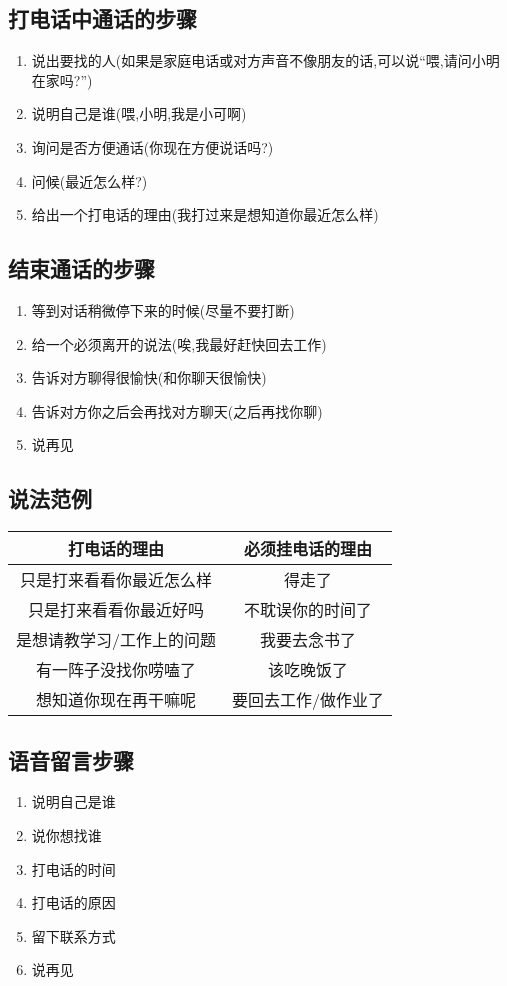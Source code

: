 \documentclass[UTF8]{article}
\newcommand{\indList}{\vspace{-6pt}}
\begin{document}
\subsection{打电话中通话的步骤}
\begin{enumerate}
    \item 说出要找的人(如果是家庭电话或对方声音不像朋友的话,可以说``喂,请问小明在家吗?'')
    \item 说明自己是谁(喂,小明,我是小可啊)
    \item 询问是否方便通话(你现在方便说话吗?)
    \item 问候(最近怎么样?)
    \item 给出一个打电话的理由(我打过来是想知道你最近怎么样)
\end{enumerate}

\subsection{结束通话的步骤}
\begin{enumerate}
    \item 等到对话稍微停下来的时候(尽量不要打断)
    \item 给一个必须离开的说法(唉,我最好赶快回去工作)
    \item 告诉对方聊得很愉快(和你聊天很愉快)
    \item 告诉对方你之后会再找对方聊天(之后再找你聊)
    \item 说再见
\end{enumerate}

\subsection{说法范例\label{4.4}}
\indList
\begin{tabular}{c|c}
\textbf{打电话的理由}&\textbf{必须挂电话的理由}\\ \hline
只是打来看看你最近怎么样&得走了\\ 
只是打来看看你最近好吗&不耽误你的时间了\\ 
是想请教学习/工作上的问题&我要去念书了\\ 
有一阵子没找你唠嗑了&该吃晚饭了\\ 
想知道你现在再干嘛呢&要回去工作/做作业了\\ 
\end{tabular}
\indList

\subsection{语音留言步骤}
\begin{enumerate}
    \item 说明自己是谁
    \item 说你想找谁
    \item 打电话的时间
    \item 打电话的原因
    \item 留下联系方式
    \item 说再见
\end{enumerate}
\end{document}
